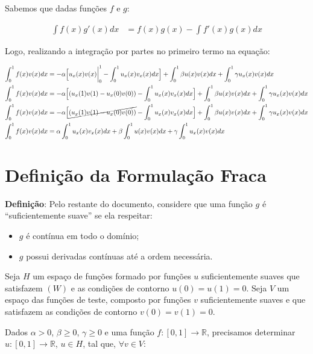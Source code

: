 Sabemos que dadas funções $f$ e $g$:

\begin{align*}
  \int f(x)g'(x)dx &= f(x)g(x) - \int f'(x)g(x)dx
\end{align*}

Logo, realizando a integração por partes no primeiro termo na equação:

\begin{align*}
    \int^{1}_{0} f(x)v(x) dx &= -\alpha \Big[u_{x}(x)v(x) \bigg|^{1}_{0} - \int^{1}_{0} u_{x}(x)v_{x}(x) dx\Big] + \int^{1}_{0} \beta u(x)v(x) dx + \int^{1}_{0} \gamma u_{x}(x)v(x) dx \\
    \int^{1}_{0} f(x)v(x) dx &= -\alpha \Big[(u_{x}(1)v(1) - u_{x}(0)v(0)) - \int^{1}_{0} u_{x}(x)v_{x}(x) dx\Big] + \int^{1}_{0} \beta u(x)v(x) dx + \int^{1}_{0} \gamma u_{x}(x)v(x) dx \\
    \int^{1}_{0} f(x)v(x) dx &= -\alpha \Big[\cancel{(u_{x}(1)v(1) - u_{x}(0)v(0))} - \int^{1}_{0} u_{x}(x)v_{x}(x) dx\Big] + \int^{1}_{0} \beta u(x)v(x) dx + \int^{1}_{0} \gamma u_{x}(x)v(x) dx  \\
    \int^{1}_{0} f(x)v(x) dx &= \alpha \int^{1}_{0} u_{x}(x)v_{x}(x) dx + \beta \int^{1}_{0} u(x)v(x) dx + \gamma \int^{1}_{0} u_{x}(x)v(x) dx \\
\end{align*}

\section{Definição da Formulação Fraca}

  \textbf{Definição}: Pelo restante do documento, considere que uma função $g$ é ``suficientemente suave'' se ela respeitar:
  \begin{itemize}
    \item $g$ é contínua em todo o domínio;
    \item $g$ possui derivadas contínuas até a ordem necessária.
  \end{itemize}

  Seja $H$ um espaço de funções formado por funções $u$ suficientemente suaves que satisfazem $(W)$ e as condições de contorno $u(0) = u(1) = 0$. Seja $V$ um espaço das funções de teste, composto por funções $v$ suficientemente suaves e que satisfazem as condições de contorno $v(0) = v(1) = 0$.

  Dados $\alpha > 0$, $\beta \geq 0$, $\gamma \geq 0$ e uma função $f : [0,1] \to \mathbb{R}$, precisamos determinar $u : [0,1] \to \mathbb{R}$, $u \in H$, tal que, $\forall v \in V$:

